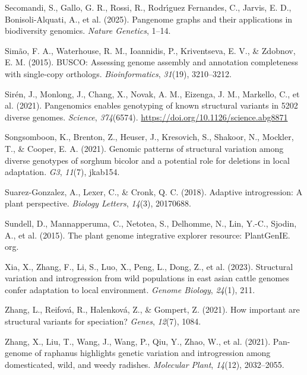 \documentclass[
]{agujournal2019}
\newlength{\cslhangindent}
\newenvironment{CSLReferences}[2] %
 {\begin{list}{}{%
  \setlength{\itemindent}{0pt}
  \setlength{\leftmargin}{0pt}
  \setlength{\parsep}{0pt}
  \ifodd #1
   \setlength{\leftmargin}{\cslhangindent}
   \setlength{\itemindent}{-1\cslhangindent}
  \fi
  \setlength{\itemsep}{#2\baselineskip}}}
 {\end{list}}
\begin{document}
\begin{CSLReferences}{1}{0}
Secomandi, S., Gallo, G. R., Rossi, R., Rodrı́guez Fernandes, C., Jarvis,
E. D., Bonisoli-Alquati, A., et al. (2025). Pangenome graphs and their
applications in biodiversity genomics. \emph{Nature Genetics}, 1--14.

Simão, F. A., Waterhouse, R. M., Ioannidis, P., Kriventseva, E. V., \&
Zdobnov, E. M. (2015). BUSCO: Assessing genome assembly and annotation
completeness with single-copy orthologs. \emph{Bioinformatics},
\emph{31}(19), 3210--3212.

Sirén, J., Monlong, J., Chang, X., Novak, A. M., Eizenga, J. M.,
Markello, C., et al. (2021). Pangenomics enables genotyping of known
structural variants in 5202 diverse genomes. \emph{Science},
\emph{374}(6574). \url{https://doi.org/10.1126/science.abg8871}

Songsomboon, K., Brenton, Z., Heuser, J., Kresovich, S., Shakoor, N.,
Mockler, T., \& Cooper, E. A. (2021). Genomic patterns of structural
variation among diverse genotypes of sorghum bicolor and a potential
role for deletions in local adaptation. \emph{G3}, \emph{11}(7),
jkab154.

Suarez-Gonzalez, A., Lexer, C., \& Cronk, Q. C. (2018). Adaptive
introgression: A plant perspective. \emph{Biology Letters},
\emph{14}(3), 20170688.

Sundell, D., Mannapperuma, C., Netotea, S., Delhomme, N., Lin, Y.-C.,
Sjodin, A., et al. (2015). The plant genome integrative explorer
resource: PlantGenIE. org.

Xia, X., Zhang, F., Li, S., Luo, X., Peng, L., Dong, Z., et al. (2023).
Structural variation and introgression from wild populations in east
asian cattle genomes confer adaptation to local environment.
\emph{Genome Biology}, \emph{24}(1), 211.

Zhang, L., Reifová, R., Halenková, Z., \& Gompert, Z. (2021). How
important are structural variants for speciation? \emph{Genes},
\emph{12}(7), 1084.

Zhang, X., Liu, T., Wang, J., Wang, P., Qiu, Y., Zhao, W., et al.
(2021). Pan-genome of raphanus highlights genetic variation and
introgression among domesticated, wild, and weedy radishes.
\emph{Molecular Plant}, \emph{14}(12), 2032--2055.

\end{CSLReferences}
\end{document}
